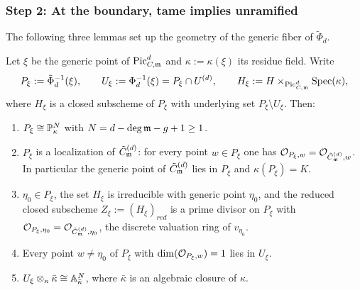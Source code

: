\subsubsection*{Step 2: At the boundary, tame implies unramified}

The following three lemmas set up the geometry of the generic fiber of $\tilde{\Phi}_d$.

\begin{lemma}\label{lemma:generic_fiber_compactified_AJ_r2}
    Let $\xi$ be the generic point of $\PicCm[d]$ and $\kappa := \kappa(\xi)$ its residue
    field. Write
    \[ P_\xi := \tilde{\Phi}_d^{-1}(\xi), \qquad
       U_\xi := \Phi_d^{-1}(\xi) = P_\xi \cap U^{(d)}, \qquad
       H_\xi := H \times_{\PicCm[d]} \Spec(\kappa), \]
    where $H_\xi$ is a closed subscheme of $P_\xi$ with underlying set $P_\xi \setminus U_\xi$.
    Then:
    \begin{enumerate}
        \item $P_\xi \cong \bP^{N}_{\kappa}$ with $N = d - \deg\mdls - g + 1 \geq 1$.
        \item $P_\xi$ is a localization of $\Cmod{d}$: for every point $w \in P_\xi$ one has
              $\Oo_{P_\xi, w} = \Oo_{\Cmod{d}, w}$. In particular the generic point of
              $\Cmod{d}$ lies in $P_\xi$ and $\kappa(P_\xi) = K$.
        \item $\eta_0 \in P_\xi$, the set $H_\xi$ is irreducible with generic point $\eta_0$,
              and the reduced closed subscheme $Z_\xi := (H_\xi)_{red}$ is a prime divisor on
              $P_\xi$ with $\Oo_{P_\xi, \eta_0} = \Oo_{\Cmod{d}, \eta_0}$, the discrete
              valuation ring of $v_{\eta_0}$.
        \item Every point $w \neq \eta_0$ of $P_\xi$ with $\dim(\Oo_{P_\xi, w}) = 1$ lies in
              $U_\xi$.
        \item $U_\xi \otimes_\kappa \bar{\kappa} \cong \A^N_{\bar{\kappa}}$, where
              $\bar{\kappa}$ is an algebraic closure of $\kappa$.
    \end{enumerate}
\end{lemma}
